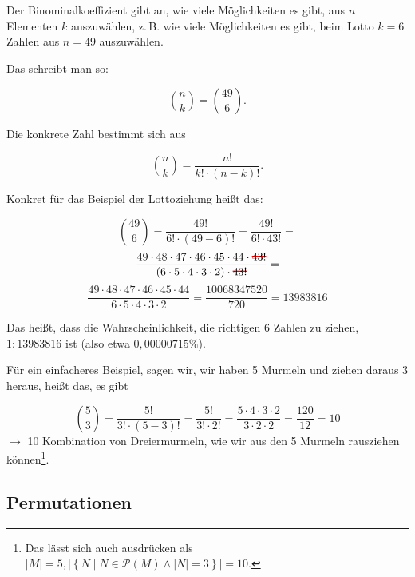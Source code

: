 \documentclass{scrartcl}
\newcommand\hcancel[2][black]{\setbox0=\hbox{$#2$}%
\rlap{\raisebox{.45\ht0}{\textcolor{#1}{\rule{\wd0}{1pt}}}}#2}
\begin{document}
Der Binominalkoeffizient gibt an, wie viele Möglichkeiten es gibt, aus $n$ Elementen $k$ auszuwählen, z.\,B. wie
viele Möglichkeiten es gibt, beim Lotto $k = 6$ Zahlen aus $n = 49$ auszuwählen.

Das schreibt man so:

\begin{equation}
	\binom{n}{k} = \binom{49}{6}.
\end{equation}

Die konkrete Zahl bestimmt sich aus

\begin{equation}
	\binom{n}{k} = \frac{n!}{k!\cdot(n - k)!}.
\end{equation}

Konkret für das Beispiel der Lottoziehung heißt das:

\begin{equation}
	\binom{49}{6} = 
	\frac{49!}{6!\cdot(49 - 6)!} =
	\frac{49!}{6!\cdot43!} =
\end{equation}
\begin{equation*}
	\frac{49 \cdot 48 \cdot 47 \cdot 46 \cdot 45 \cdot  44 \cdot  \hcancel[red]{43!}}{(6 \cdot 5 \cdot 4 \cdot 3 \cdot 2) \cdot \hcancel[red]{43!}} =
\end{equation*}
\begin{equation*}
	\frac{49 \cdot 48 \cdot 47 \cdot 46 \cdot 45 \cdot  44}{6 \cdot 5 \cdot 4 \cdot 3 \cdot 2} = \frac{10068347520}{720} = 13983816
\end{equation*}

Das heißt, dass die Wahrscheinlichkeit, die richtigen 6 Zahlen zu ziehen, $1 : 13983816$ ist (also etwa $0,00000715\%$).

Für ein einfacheres Beispiel, sagen wir, wir haben 5 Murmeln und ziehen daraus 3 heraus, heißt das, es gibt

\begin{equation}
	\binom{5}{3} =
	\frac{5!}{3!\cdot(5 - 3)!} =
	\frac{5!}{3!\cdot 2!} =
	\frac{5\cdot 4 \cdot 3 \cdot 2}{3\cdot 2 \cdot 2} =
	\frac{120}{12} = 10
\end{equation}
$\rightarrow$ 10 Kombination von Dreiermurmeln, wie wir aus den 5 Murmeln rausziehen können\footnote{Das lässt sich auch ausdrücken
als $|M| = 5, \left|\left\{ N \middle| N\in \mathcal{P}(M) \wedge |N| = 3 \right\}\right| = 10$.}.

\subsection{Permutationen}
\end{document}
